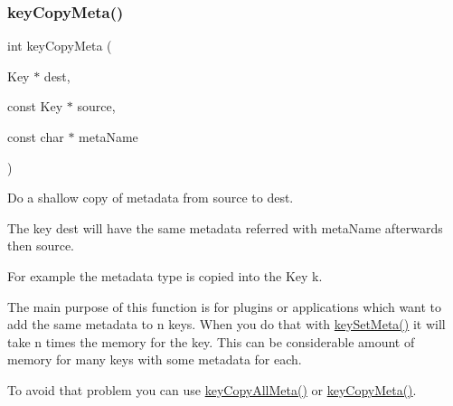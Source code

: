 \subsubsection{\texorpdfstring{keyCopyMeta()}{keyCopyMeta()}}
{\footnotesize\ttfamily int key\+Copy\+Meta (\begin{DoxyParamCaption}\item[{Key $\ast$}]{dest,  }\item[{const Key $\ast$}]{source,  }\item[{const char $\ast$}]{meta\+Name }\end{DoxyParamCaption})}



Do a shallow copy of metadata from source to dest. 

The key dest will have the same metadata referred with meta\+Name afterwards then source.

For example the metadata type is copied into the Key k.


\begin{DoxyCode}{0}
\DoxyCodeLine{\{}
\DoxyCodeLine{        \textcolor{comment}{// receive c}}
\DoxyCodeLine{        \textcolor{comment}{// the caller will see the changed key k}}
\DoxyCodeLine{        \textcolor{comment}{// with the metadata "type" from c}}
\DoxyCodeLine{\}}
\end{DoxyCode}


The main purpose of this function is for plugins or applications which want to add the same metadata to n keys. When you do that with \mbox{\hyperlink{group__keymeta_gae1f15546b234ffb6007d8a31178652b9}{key\+Set\+Meta()}} it will take n times the memory for the key. This can be considerable amount of memory for many keys with some metadata for each.

To avoid that problem you can use \mbox{\hyperlink{group__keymeta_ga8e63720a65610a29597494d0671f9401}{key\+Copy\+All\+Meta()}} or \mbox{\hyperlink{group__keymeta_ga9a22b992478e613c8788bd460b4a1f0c}{key\+Copy\+Meta()}}.


